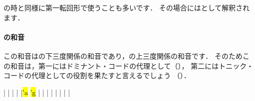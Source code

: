 \documentclass[dvipdfmx,uplatex,b5paper,openany,jbase=12Q,nomag*,textwidth-limit=44%
               ]{gachimuchi}
\begin{document}
\Gnii\Min の時と同様に第一転回形で使うことも多いです．
その場合にはとして解釈されます．

\paragraph{\Gniii\Min の和音}
この和音は\Gnv の下三度関係の和音であり，\Gni の上三度関係の和音です．
そのためこの和音は，第一にはドミナント・コードの代理として（），
第二にはトニック・コードの代理としての役割を果たすと言えるでしょう
（）．

\begin{floatMusic}[pos=ht]
  \Startpiece%
  \znotes|\en
  \NOTes
  |%
  \en\bar
  \NOTEs
  |%
  \en\doublebar
  \NOTes
  |\hl{'a}%
  \hl{'g}%
  \en\bar
  \NOTEs
  |%
  \en\doublebar
  \NOTes
  |%
  \en\bar
  \NOTEs
  |%
  \en\doublebar
  \NOTes
  |%
  \en\bar
  \NOTEs
  |%
  \en\setdoublebar
  \endpiece%
\end{floatMusic}

\end{document}
